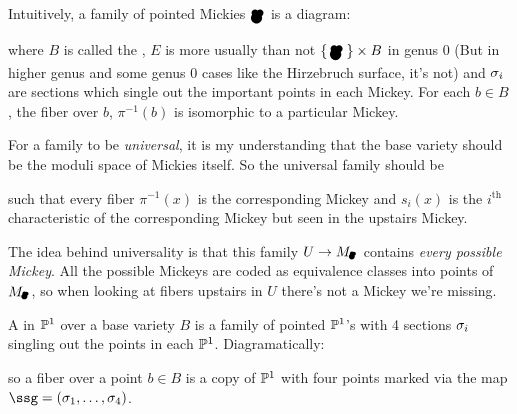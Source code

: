 \documentclass[12pt]{memoir}
\newcommand{\Mickey}{\pre{\raisebox{-1mm}{\scalebox{1.3}{\ensuremath\bullet}}}\hspace{-2.3 mm}{\raisebox{-1.65mm}{\scalebox{2.1}{\ensuremath\bullet}}}^{\hspace{-2.1mm}\raisebox{-1mm}{\scalebox{1.3}{\ensuremath\bullet}}}}
\newcommand{\Submickey}{\pre{\scalebox{0.75}{\ensuremath\bullet}}\hspace{-1.4mm}{\raisebox{-0.35mm}{\scalebox{1.1}{\ensuremath\bullet}}}^{\hspace{-1.1mm}\raisebox{-0.1mm}{\scalebox{0.75}{\ensuremath\bullet}}}}
\begin{document}
Intuitively, a family of pointed Mickies $\Mickey$ is a diagram:
\begin{figure}[h!]
    \centering
{}
    \label{fig-example-family-diagram}
\end{figure}
where $B$ is called the , $E$ is more usually than not $\set{\Mickey}\x B$ in genus 0 (But in higher genus and some genus 0 cases like the Hirzebruch surface, it's not) and $\sigma_i$ are sections which single out the important points in each Mickey. For each $b\in B$, the fiber over $b$, $\pi^{-1}(b)$ is isomorphic to a particular Mickey.\par 
For a family to be \emph{universal}, it is my understanding that the base variety should be the moduli space of Mickies itself. So the universal family should be 

\begin{figure}[h!]
    \centering
{}
    \label{fig-example-universal-family-diagram}
\end{figure}

such that every fiber $\pi^{-1}(x)$ is the corresponding Mickey and $s_i(x)$ is the $i^{\text{th}}$ characteristic of the corresponding Mickey but seen in the upstairs Mickey.

\begin{Rmk}\label{rmk-intuition-universal-family}
    The idea behind universality is that this family $U\to M_{\Submickey}$ contains \emph{every possible Mickey}. All the possible Mickeys are coded as equivalence classes into points of $M_{\Submickey}$, so when looking at fibers upstairs in $U$ there's not a Mickey we're missing.
\end{Rmk}

\begin{Def}
    A  in $\mathbb{P}^1$ over a base variety $B$ is a family of pointed $\mathbb{P}^1$'s with 4 sections $\sigma_i$ singling out the points in each $\mathbb{P}^1$. Diagramatically: 
    \begin{center}
    \end{center}
    so a fiber over a point $b\in B$ is a copy of $\mathbb{P}^1$ with four points marked via the map $\ssg=(\sg_1,\dots,\sg_4)$.
\end{Def}
\end{document}
